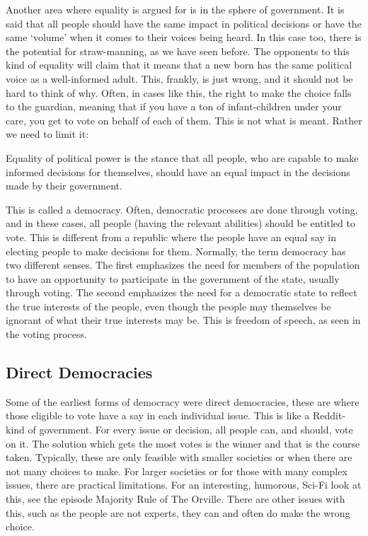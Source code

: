 Another area where equality is argued for is in the sphere of government. It is said that all people should have the same impact in political decisions or have the same ‘volume’ when it comes to their voices being heard. In this case too, there is the potential for straw-manning, as we have seen before. The opponents to this kind of equality will claim that it means that a new born has the same political voice as a well-informed adult. This, frankly, is just wrong, and it should not be hard to think of why. Often, in cases like this, the right to make the choice falls to the guardian, meaning that if you have a ton of infant-children under your care, you get to vote on behalf of each of them. This is not what is meant. Rather we need to limit it:
\begin{center}
Equality of political power is the stance that all people, who are capable to make informed decisions for themselves, should have an equal impact in the decisions made by their government.
\end{center}
This is called a democracy. Often, democratic processes are done through voting, and in these cases, all people (having the relevant abilities) should be entitled to vote. This is different from a republic where the people have an equal say in electing people to make decisions for them.  Normally, the term democracy has two different senses. The first emphasizes the need for members of the population to have an opportunity to participate in the government of the state, usually through voting. The second emphasizes the need for a democratic state to reflect the true interests of the people, even though the people may themselves be ignorant of what their true interests may be. This is freedom of speech, as seen in the voting process.
\subsection{Direct Democracies}

Some of the earliest forms of democracy were direct democracies, these are where those eligible to vote have a say in each individual issue. This is like a Reddit-kind of government. For every issue or decision, all people can, and should, vote on it. The solution which gets the most votes is the winner and that is the course taken. Typically, these are only feasible with smaller societies or when there are not many choices to make. For larger societies or for those with many complex issues, there are practical limitations. For an interesting, humorous, Sci-Fi look at this, see the episode Majority Rule of The Orville. There are other issues with this, such as the people are not experts, they can and often do make the wrong choice.
